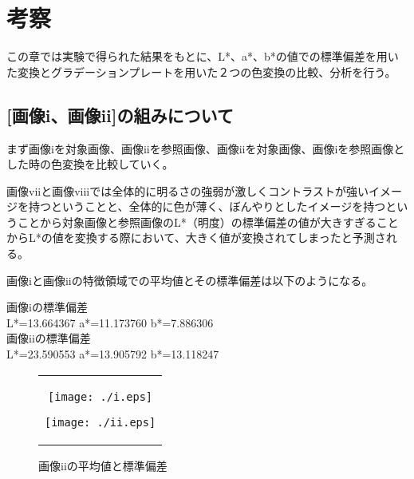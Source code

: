 \chapter{考察}
この章では実験で得られた結果をもとに、L*、a*、b*の値での標準偏差を用いた変換とグラデーションプレートを用いた２つの色変換の比較、分析を行う。

\section{[画像i、画像ii]の組みについて}
まず画像iを対象画像、画像iiを参照画像、画像iiを対象画像、画像iを参照画像とした時の色変換を比較していく。\par
画像viiと画像viiiでは全体的に明るさの強弱が激しくコントラストが強いイメージを持つということと、全体的に色が薄く、ぼんやりとしたイメージを持つということから対象画像と参照画像のL*（明度）の標準偏差の値が大きすぎることからL*の値を変換する際において、大きく値が変換されてしまったと予測される。\par
画像iと画像iiの特徴領域での平均値とその標準偏差は以下のようになる。
\begin{screen}
画像iの標準偏差\\
L*=13.664367 a*=11.173760 b*=7.886306\\
画像iiの標準偏差\\
L*=23.590553 a*=13.905792 b*=13.118247
  \end{screen}
\begin{figure}[htbp]
  \begin{center}
    \begin{tabular}{c}

      \begin{minipage}{0.45\hsize}
        \begin{center}
          \texttt{[image: ./i.eps]}
          \caption{画像iの平均値と標準偏差}
          \label{fig:seininhsv}
        \end{center}
      \end{minipage}

      \begin{minipage}{0.45\hsize}
        \begin{center}
          \texttt{[image: ./ii.eps]}
          \caption{画像iiの平均値と標準偏差}
          \label{fig:kinninhsv}
        \end{center}
      \end{minipage}


    \end{tabular}
  \end{center}
\end{figure}

